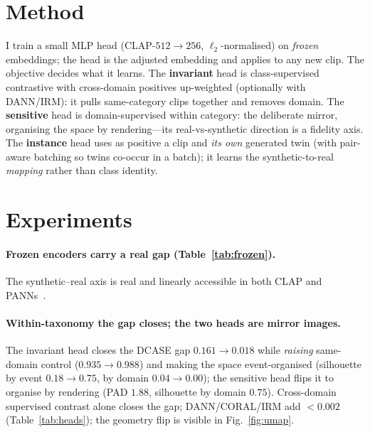 \documentclass{article}
\begin{document}
\section{Method}
I train a small MLP head ($\text{CLAP-}512\!\to\!256$, $\ell_2$-normalised) on \emph{frozen}
embeddings; the head is the adjusted embedding and applies to any new clip. The objective decides
what it learns. The \textbf{invariant} head is class-supervised contrastive with cross-domain
positives up-weighted (optionally with DANN/IRM): it pulls same-category clips together and removes
domain. The \textbf{sensitive} head is domain-supervised within category: the deliberate mirror,
organising the space by rendering---its real-vs-synthetic direction is a fidelity axis. The
\textbf{instance} head uses as positive a clip and \emph{its own} generated twin (with pair-aware
batching so twins co-occur in a batch); it learns the synthetic-to-real \emph{mapping} rather than
class identity.

\section{Experiments}
\label{sec:exp}
\paragraph{Frozen encoders carry a real gap (Table~\ref{tab:frozen}).} The synthetic--real axis is
real and linearly accessible in both CLAP and PANNs~\citep{kong2020panns}.

\paragraph{Within-taxonomy the gap closes; the two heads are mirror images.} The invariant head
closes the DCASE gap $0.161\!\to\!0.018$ while \emph{raising} same-domain control ($0.935\!\to\!0.988$)
and making the space event-organised (silhouette by event $0.18\!\to\!0.75$, by domain
$0.04\!\to\!0.00$); the sensitive head flips it to organise by rendering (PAD $1.88$, silhouette by
domain $0.75$). Cross-domain supervised contrast alone closes the gap; DANN/CORAL/IRM add $<0.002$
(Table~\ref{tab:heads}); the geometry flip is visible in Fig.~\ref{fig:umap}.
\end{document}
